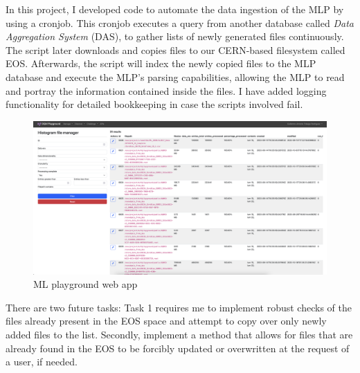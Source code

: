 In this project, I developed code to automate the data ingestion of the MLP by using a cronjob. This cronjob executes a query from another database called \textit{Data Aggregation System} (DAS), to gather lists of newly generated files continuously. The script later downloads and copies files to our CERN-based filesystem called EOS. Afterwards, the script will index the newly copied files to the MLP database and execute the MLP's parsing capabilities, allowing the MLP to read and portray the information contained inside the files.
I have added logging functionality for detailed bookkeeping in case the scripts involved fail.




\begin{figure}
	\centering
	\includegraphics*[width=\linewidth,trim = 1cm 5.2in 13.6in 0]{Images/MLP.png}
	\caption{ML playground web app}
	\label{fig:MLplayground}
\end{figure}


There are two future tasks: Task 1 requires me to implement robust checks of the files already present in the EOS space and attempt to copy over only newly added files to the list.
Secondly, implement a method that allows for files that are already found in the EOS to be forcibly updated or overwritten at the request of a user, if needed.


